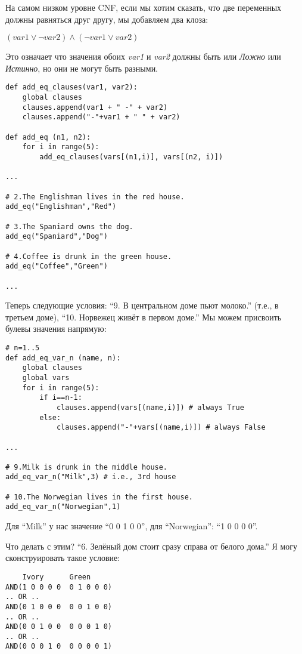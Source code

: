 На самом низком уровне CNF, если мы хотим сказать, что две переменных должны равняться друг другу,
мы добавляем два клоза:

$(var1 \vee \neg var2) \wedge (\neg var1 \vee var2)$

Это означает что значения обоих \textit{var1} и \textit{var2} должны быть или \textit{Ложно} или \textit{Истинно},
но они не могут быть разными.

\begin{lstlisting}
def add_eq_clauses(var1, var2):
    global clauses
    clauses.append(var1 + " -" + var2)
    clauses.append("-"+var1 + " " + var2)

def add_eq (n1, n2):
    for i in range(5):
        add_eq_clauses(vars[(n1,i)], vars[(n2, i)])

...

# 2.The Englishman lives in the red house.
add_eq("Englishman","Red")

# 3.The Spaniard owns the dog.
add_eq("Spaniard","Dog")

# 4.Coffee is drunk in the green house.
add_eq("Coffee","Green")

...

\end{lstlisting}

Теперь следующие условия:
``9. В центральном доме пьют молоко.'' (т.е., в третьем доме), ``10. Норвежец живёт в первом доме.''
Мы можем присвоить булевы значения напрямую:

\begin{lstlisting}
# n=1..5
def add_eq_var_n (name, n):
    global clauses
    global vars
    for i in range(5):
        if i==n-1:
            clauses.append(vars[(name,i)]) # always True
        else:
            clauses.append("-"+vars[(name,i)]) # always False

...

# 9.Milk is drunk in the middle house.
add_eq_var_n("Milk",3) # i.e., 3rd house

# 10.The Norwegian lives in the first house.
add_eq_var_n("Norwegian",1)
\end{lstlisting}

Для ``Milk'' у нас значение ``0 0 1 0 0'', для ``Norwegian'': ``1 0 0 0 0''.

Что делать с этим?
``6. Зелёный дом стоит сразу справа от белого дома.''
Я могу сконструировать такое условие:

\begin{lstlisting}
    Ivory      Green
AND(1 0 0 0 0  0 1 0 0 0)
.. OR ..
AND(0 1 0 0 0  0 0 1 0 0)
.. OR ..
AND(0 0 1 0 0  0 0 0 1 0)
.. OR ..
AND(0 0 0 1 0  0 0 0 0 1)
\end{lstlisting}

